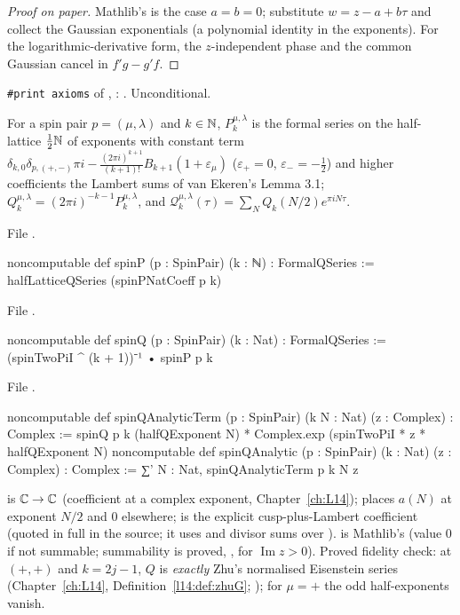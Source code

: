 \begin{proof}[Proof on paper]
Mathlib's  is the case $a=b=0$; substitute
$w=z-a+b\tau$ and collect the Gaussian exponentials (a polynomial identity in the exponents). For the
logarithmic-derivative form, the $z$-independent phase and the common Gaussian cancel in
$f'g-g'f$.
\end{proof}
\begin{status}
\texttt{\#print axioms} of , : . Unconditional.
\end{status}

\begin{definition}\label{l17:def:spinP}
For a spin pair $p=(\mu,\lambda)$ and $k\in{\mathbb{N}}$, $P^{\mu,\lambda}_k$ is the formal series on the half-lattice
$\frac12{\mathbb{N}}$ of exponents with constant term $\delta_{k,0}\delta_{p,(+,-)}\pi i-\frac{(2\pi i)^{k+1}}{(k+1)!}B_{k+1}(1+\varepsilon_\mu)$
($\varepsilon_+=0$, $\varepsilon_-=-\frac12$) and higher coefficients the Lambert sums of van Ekeren's
Lemma 3.1; $Q^{\mu,\lambda}_k=(2\pi i)^{-k-1}P^{\mu,\lambda}_k$, and $\mathcal Q^{\mu,\lambda}_k(\tau)=\sum_NQ_k(N/2)e^{\pi iN\tau}$.
\end{definition}
\noindent File .
\begin{leancode}
noncomputable def spinP (p : SpinPair) (k : ℕ) : FormalQSeries :=
  halfLatticeQSeries (spinPNatCoeff p k)
\end{leancode}
\noindent File .
\begin{leancode}
noncomputable def spinQ (p : SpinPair) (k : Nat) : FormalQSeries :=
  (spinTwoPiI ^ (k + 1))⁻¹ • spinP p k
\end{leancode}
\noindent File .
\begin{leancode}
noncomputable def spinQAnalyticTerm (p : SpinPair) (k N : Nat) (z : Complex) : Complex :=
  spinQ p k (halfQExponent N) *
    Complex.exp (spinTwoPiI * z * halfQExponent N)
noncomputable def spinQAnalytic (p : SpinPair) (k : Nat) (z : Complex) : Complex :=
  ∑' N : Nat, spinQAnalyticTerm p k N z
\end{leancode}
\begin{dictionary}
 is ${\mathbb{C}}\to{\mathbb{C}}$ (coefficient at a complex exponent, Chapter~\ref{ch:L14});
 places $a(N)$ at exponent $N/2$ and $0$ elsewhere; 
is the explicit cusp-plus-Lambert coefficient (quoted in full in the source; it uses
 and divisor sums over ).  is
Mathlib's  (value $0$ if not summable; summability is proved,
, for $\operatorname{Im}z>0$). Proved fidelity check: at $(+,+)$ and
$k=2j-1$, $Q$ is \emph{exactly} Zhu's normalised Eisenstein series 
(Chapter~\ref{ch:L14}, Definition~\ref{l14:def:zhuG}; ); for
$\mu=+$ the odd half-exponents vanish.
\end{dictionary}

